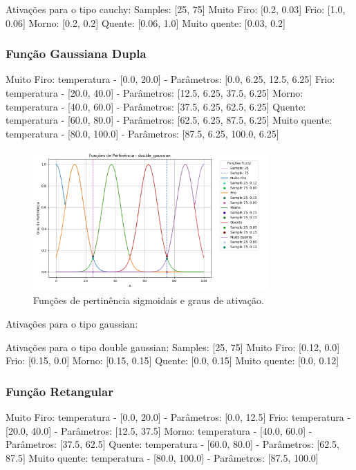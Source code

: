\documentclass[a4paper,12pt]{article}
\begin{document}
Ativações para o tipo cauchy:
Samples: [25, 75]
Muito Firo: [0.2, 0.03]
Frio: [1.0, 0.06]
Morno: [0.2, 0.2]
Quente: [0.06, 1.0]
Muito quente: [0.03, 0.2]

\subsubsection{Função Gaussiana Dupla}

Muito Firo: temperatura - [0.0, 20.0] - Parâmetros: [0.0, 6.25, 12.5, 6.25]
Frio: temperatura - [20.0, 40.0] - Parâmetros: [12.5, 6.25, 37.5, 6.25]
Morno: temperatura - [40.0, 60.0] - Parâmetros: [37.5, 6.25, 62.5, 6.25]
Quente: temperatura - [60.0, 80.0] - Parâmetros: [62.5, 6.25, 87.5, 6.25]
Muito quente: temperatura - [80.0, 100.0] - Parâmetros: [87.5, 6.25, 100.0, 6.25]

\begin{figure}[H]
    \centering
    \includegraphics[width=0.8\textwidth]{img/funções_de_pertinência_double_gaussian_fuzzificado.png}
    \caption{Funções de pertinência sigmoidais e graus de ativação.}
\end{figure}
Ativações para o tipo gaussian:

Ativações para o tipo double gaussian:
Samples: [25, 75]
Muito Firo: [0.12, 0.0]
Frio: [0.15, 0.0]
Morno: [0.15, 0.15]
Quente: [0.0, 0.15]
Muito quente: [0.0, 0.12]

\subsubsection{Função Retangular}

Muito Firo: temperatura - [0.0, 20.0] - Parâmetros: [0.0, 12.5]
Frio: temperatura - [20.0, 40.0] - Parâmetros: [12.5, 37.5]
Morno: temperatura - [40.0, 60.0] - Parâmetros: [37.5, 62.5]
Quente: temperatura - [60.0, 80.0] - Parâmetros: [62.5, 87.5]
Muito quente: temperatura - [80.0, 100.0] - Parâmetros: [87.5, 100.0]
\end{document}
